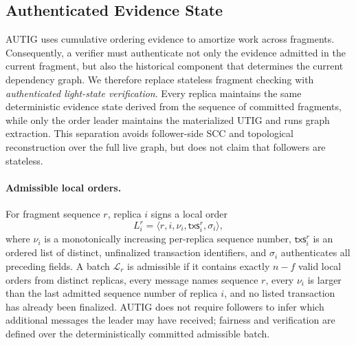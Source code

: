 
\subsection{Authenticated Evidence State}
\label{sec:authenticated-evidence-state}

AUTIG uses cumulative ordering evidence to amortize work across fragments.
Consequently, a verifier must authenticate not only the evidence admitted in
the current fragment, but also the historical component that determines the
current dependency graph. We therefore replace stateless fragment checking
with \emph{authenticated light-state verification}. Every replica maintains
the same deterministic evidence state derived from the sequence of committed
fragments, while only the order leader maintains the materialized UTIG and
runs graph extraction. This separation avoids follower-side SCC and
topological reconstruction over the full live graph, but does not claim that
followers are stateless.

\paragraph{Admissible local orders.}
For fragment sequence $r$, replica $i$ signs a local order
\[
  L_i^r = \langle r,i,\nu_i,\mathsf{txs}_i^r,\sigma_i\rangle,
\]
where $\nu_i$ is a monotonically increasing per-replica sequence number,
$\mathsf{txs}_i^r$ is an ordered list of distinct, unfinalized transaction
identifiers, and $\sigma_i$ authenticates all preceding fields. A batch
$\mathcal L_r$ is admissible if it contains exactly $n-f$ valid local orders
from distinct replicas, every message names sequence $r$, every $\nu_i$ is
larger than the last admitted sequence number of replica $i$, and no listed
transaction has already been finalized. AUTIG does not require followers to
infer which additional messages the leader may have received; fairness and
verification are defined over the deterministically committed admissible
batch.

